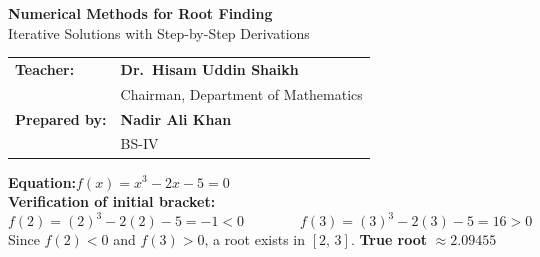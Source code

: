 \documentclass[12pt]{article}
\begin{document}
\thispagestyle{empty}

\begin{tcolorbox}[
  enhanced, arc=0pt, boxrule=0pt,
  colback=primary, colframe=primary,
  left=16pt, right=16pt, top=18pt, bottom=14pt,
  borderline south={4pt}{0pt}{accent},
]
  \centering
  {\huge\bfseries\color{white} Numerical Methods for Root Finding}\\[8pt]
  {\large\color{lightbg} Iterative Solutions with Step-by-Step Derivations}
\end{tcolorbox}

\vspace{4pt}

\begin{tcolorbox}[
  enhanced, arc=0pt, boxrule=0pt,
  colback=white, colframe=white,
  borderline north={1.5pt}{0pt}{accent!60},
  borderline south={1.5pt}{0pt}{accent!60},
  left=16pt, right=16pt, top=12pt, bottom=12pt,
]
  \begin{tabular}{p{3.2cm} p{9.5cm}}
    \textcolor{primary}{\textbf{Teacher:}}
      & \textbf{Dr.\ Hisam Uddin Shaikh} \\
      & {\small\color{darktext}Chairman, Department of Mathematics} \\[8pt]
    \textcolor{primary}{\textbf{Prepared by:}}
      & \textbf{Nadir Ali Khan} \\
      & {\small\color{darktext}BS-IV} \\
  \end{tabular}
\end{tcolorbox}

\vspace{14pt}

\begin{problembox}
\textbf{Equation:}\quad $f(x) = x^3 - 2x - 5 = 0$\\[6pt]
\textbf{Verification of initial bracket:}
\[
  f(2) = (2)^3 - 2(2) - 5 = -1 < 0
  \qquad\qquad
  f(3) = (3)^3 - 2(3) - 5 = 16 > 0
\]
Since $f(2) < 0$ and $f(3) > 0$, a root exists in $[2,\,3]$.
\quad\textbf{True root} $\approx 2.09455$
\end{problembox}

\newpage

\end{document}

